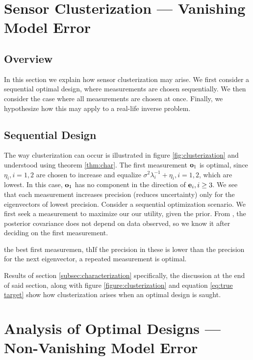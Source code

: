 \documentclass{amsart}
\numberwithin{equation}{section}
\begin{document}
\section{Sensor Clusterization --- Vanishing Model Error}\label{section:clusterization}
\subsection{Overview}
In this section we explain how sensor clusterization may arise. We
first consider a sequential optimal design, where measurements are
chosen sequentially. We then consider the case where all measurements
are chosen at once. Finally, we hypothesize how this may apply to a
real-life inverse problem.


\subsection{Sequential Design}
The way clusterization can occur is illustrated in figure
\ref{fig:clusterization} and understood using theorem
\ref{thm:char}. The first measurement $\mathbf{o}_1$ is optimal, since
$\eta_i, i=1,2$ are chosen to increase and equalize
$\sigma^2\lambda_i^{-1} +\eta_i, i=1,2$, which are lowest. In this
case, $\mathbf{o}_1$ has no component in the direction of $\mathbf{e}_i, i\geq
3$. We see that each measurement increases precision (reduces
uncertainty) only for the eigenvectors of lowest precision. Consider a
sequential optimization scenario. We first seek a measurement to
maximize our our utility, given the prior. From , the posterior
covariance does not depend on data observed, so we know it after
deciding on the first measurement.

the best
first measuremen, thIf the precision in these is lower than the
precision for the next eigenvector, a repeated measurement is optimal.

Results of section \ref{subsec:characterization} specifically, the
discussion at the end of said section, along with figure
\ref{figure:clusterization} and equation \eqref{eq:true target} show
how clusterization arises when an optimal design is saught.









\section{Analysis of Optimal Designs --- Non-Vanishing Model Error}
\end{document}
